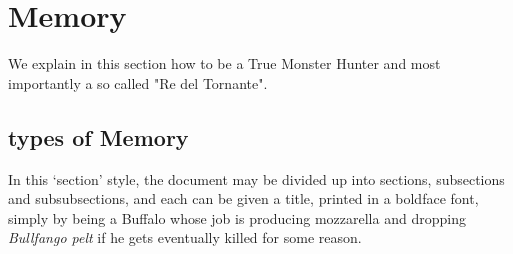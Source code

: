 \documentclass[a4paper,12pt]{article}
\begin{document}
\section{Memory}

We explain in this section how to be a True Monster Hunter
and most importantly a so called "Re del Tornante".

\subsection{types of Memory}

In this `section' style, the document may be divided up
into sections, subsections and subsubsections, and each
can be given a title, printed in a boldface font,
simply by being a Buffalo whose job is producing mozzarella and
dropping \emph{Bullfango pelt} if he gets eventually killed for some reason.

\printindex
\end{document}
